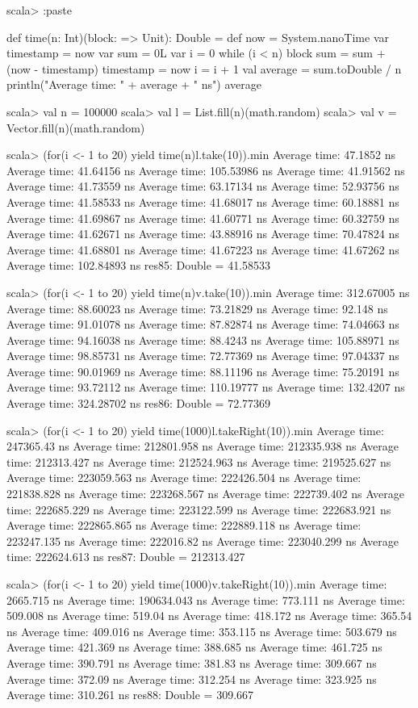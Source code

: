 \begin{REPLnonum}
scala> :paste

def time(n: Int)(block: => Unit): Double =  {
  def now = System.nanoTime
  var timestamp = now
  var sum = 0L
  var i = 0
  while (i < n) {
    block
    sum = sum + (now - timestamp)
    timestamp = now
    i = i + 1
  }
  val average = sum.toDouble / n
  println("Average time: " + average + " ns")
  average
}

scala> val n = 100000
scala> val l = List.fill(n)(math.random)
scala> val v = Vector.fill(n)(math.random)

scala> (for(i <- 1 to 20) yield time(n){l.take(10)}).min
Average time: 47.1852 ns
Average time: 41.64156 ns
Average time: 105.53986 ns
Average time: 41.91562 ns
Average time: 41.73559 ns
Average time: 63.17134 ns
Average time: 52.93756 ns
Average time: 41.58533 ns
Average time: 41.68017 ns
Average time: 60.18881 ns
Average time: 41.69867 ns
Average time: 41.60771 ns
Average time: 60.32759 ns
Average time: 41.62671 ns
Average time: 43.88916 ns
Average time: 70.47824 ns
Average time: 41.68801 ns
Average time: 41.67223 ns
Average time: 41.67262 ns
Average time: 102.84893 ns
res85: Double = 41.58533

scala> (for(i <- 1 to 20) yield time(n){v.take(10)}).min
Average time: 312.67005 ns
Average time: 88.60023 ns
Average time: 73.21829 ns
Average time: 92.148 ns
Average time: 91.01078 ns
Average time: 87.82874 ns
Average time: 74.04663 ns
Average time: 94.16038 ns
Average time: 88.4243 ns
Average time: 105.88971 ns
Average time: 98.85731 ns
Average time: 72.77369 ns
Average time: 97.04337 ns
Average time: 90.01969 ns
Average time: 88.11196 ns
Average time: 75.20191 ns
Average time: 93.72112 ns
Average time: 110.19777 ns
Average time: 132.4207 ns
Average time: 324.28702 ns
res86: Double = 72.77369

scala> (for(i <- 1 to 20) yield time(1000){l.takeRight(10)}).min
Average time: 247365.43 ns
Average time: 212801.958 ns
Average time: 212335.938 ns
Average time: 212313.427 ns
Average time: 212524.963 ns
Average time: 219525.627 ns
Average time: 223059.563 ns
Average time: 222426.504 ns
Average time: 221838.828 ns
Average time: 223268.567 ns
Average time: 222739.402 ns
Average time: 222685.229 ns
Average time: 223122.599 ns
Average time: 222683.921 ns
Average time: 222865.865 ns
Average time: 222889.118 ns
Average time: 223247.135 ns
Average time: 222016.82 ns
Average time: 223040.299 ns
Average time: 222624.613 ns
res87: Double = 212313.427

scala> (for(i <- 1 to 20) yield time(1000){v.takeRight(10)}).min
Average time: 2665.715 ns
Average time: 190634.043 ns
Average time: 773.111 ns
Average time: 509.008 ns
Average time: 519.04 ns
Average time: 418.172 ns
Average time: 365.54 ns
Average time: 409.016 ns
Average time: 353.115 ns
Average time: 503.679 ns
Average time: 421.369 ns
Average time: 388.685 ns
Average time: 461.725 ns
Average time: 390.791 ns
Average time: 381.83 ns
Average time: 309.667 ns
Average time: 372.09 ns
Average time: 312.254 ns
Average time: 323.925 ns
Average time: 310.261 ns
res88: Double = 309.667

\end{REPLnonum}

